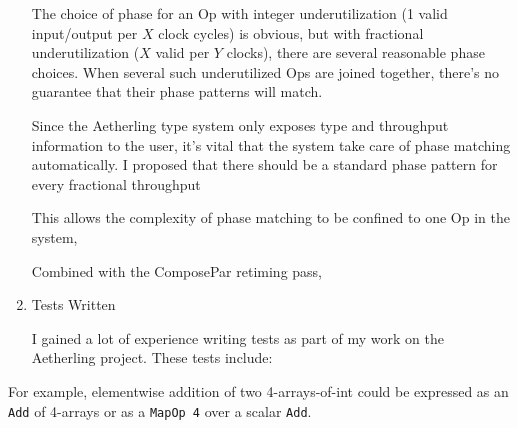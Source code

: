 \documentclass[11pt]{article}
\begin{document}
\begin{enumerate}
The choice of phase for an Op with integer underutilization (1 valid
input/output per $X$ clock cycles) is obvious, but with fractional
underutilization ($X$ valid per $Y$ clocks), there are several
reasonable phase choices. When several such underutilized Ops
are joined together, there's no guarantee that their phase patterns
will match.

Since the Aetherling type system only exposes type and throughput
information to the user, it's vital that the system take care of
phase matching automatically. I proposed that there should be a
standard phase pattern for every fractional throughput

This allows the complexity of phase matching to be confined to one
Op in the system, 

Combined with the ComposePar retiming pass, 

\item Tests Written

I gained a lot of experience writing tests as part of my work
on the Aetherling project. These tests include:

\end{enumerate}

For example, elementwise addition of two
4-arrays-of-int could be expressed as an \texttt{Add} of 4-arrays or as
a \texttt{MapOp 4} over a scalar \texttt{Add}.
\end{document}
